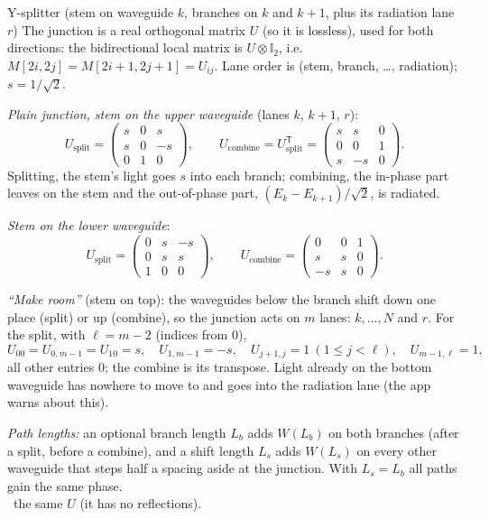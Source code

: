 \documentclass[10pt,a4paper]{article}
\newcommand{\fwd}{\text{\textcolor{muted}{\small\textsc{forward only:}}}\ }
\newcommand{\pars}[1]{\textcolor{muted}{\normalfont\small #1}}
\newcommand{\T}{\mathsf{T}}
\begin{document}
\begin{comp}{Y-splitter \pars{(stem on waveguide $k$, branches on $k$ and $k{+}1$, plus its radiation lane $r$)}}
The junction is a real orthogonal matrix $U$ (so it is lossless), used for both directions:
the bidirectional local matrix is $U\otimes\mathbb{I}_2$, i.e.\ $M[2i,2j]=M[2i{+}1,2j{+}1]=U_{ij}$.
Lane order is (stem, branch, \dots, radiation); $s = 1/\sqrt2$.

\emph{Plain junction, stem on the upper waveguide} (lanes $k$, $k{+}1$, $r$):
\[
  U_{\text{split}} = \begin{pmatrix} s & 0 & s\\ s & 0 & -s\\ 0 & 1 & 0\end{pmatrix},\qquad
  U_{\text{combine}} = U_{\text{split}}^{\T} = \begin{pmatrix} s & s & 0\\ 0 & 0 & 1\\ s & -s & 0\end{pmatrix}.
\]
Splitting, the stem's light goes $s$ into each branch; combining, the in-phase part leaves on the stem and the
out-of-phase part, $(E_k-E_{k+1})/\sqrt2$, is radiated.

\emph{Stem on the lower waveguide}:
\[
  U_{\text{split}} = \begin{pmatrix} 0 & s & -s\\ 0 & s & s\\ 1 & 0 & 0\end{pmatrix},\qquad
  U_{\text{combine}} = \begin{pmatrix} 0 & 0 & 1\\ s & s & 0\\ -s & s & 0\end{pmatrix}.
\]

\emph{``Make room''} (stem on top): the waveguides below the branch shift down one place (split) or up (combine), so the
junction acts on $m$ lanes: $k,\dots,N$ and $r$. For the split, with $\ell = m-2$ (indices from $0$),
\[
  U_{00}=U_{0,m-1}=U_{10}=s,\quad U_{1,m-1}=-s,\quad U_{j+1,j}=1\ (1\le j<\ell),\quad U_{m-1,\ell}=1,
\]
all other entries $0$; the combine is its transpose. Light already on the bottom waveguide has nowhere to move to and goes into
the radiation lane (the app warns about this).

\emph{Path lengths:} an optional branch length $L_b$ adds $W(L_b)$ on both branches (after a split, before a combine), and a
shift length $L_s$ adds $W(L_s)$ on every other waveguide that steps half a spacing aside at the junction. With $L_s = L_b$ all
paths gain the same phase.\\
\fwd the same $U$ (it has no reflections).
\end{comp}
\end{document}
